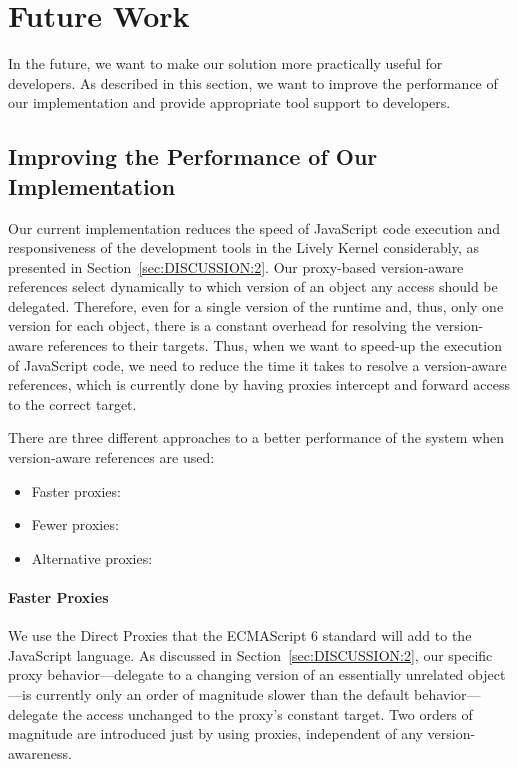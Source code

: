 \chapter{Future Work} \label{chapter:FUTURE_WORK}

In the future, we want to make our solution more practically useful for developers.
As described in this section, we want to improve the performance of our implementation and provide appropriate tool support to developers.



\section{Improving the Performance of Our Implementation} \label{sec:FUTURE_WORK:1}


Our current implementation reduces the speed of JavaScript code execution and responsiveness of the development tools in the Lively Kernel considerably, as presented in Section~\ref{sec:DISCUSSION:2}.
Our proxy-based version-aware references select dynamically to which version of an object any access should be delegated.
Therefore, even for a single version of the runtime and, thus, only one version for each object, there is a constant overhead for resolving the version-aware references to their targets.
Thus, when we want to speed-up the execution of JavaScript code, we need to reduce the time it takes to resolve a version-aware references, which is currently done by having proxies intercept and forward access to the correct target.

There are three different approaches to a better performance of the system when version-aware references are used:

\begin{itemize}
    \item Faster proxies:
    \item Fewer proxies:
    \item Alternative proxies:
\end{itemize}


\subsubsection{Faster Proxies}
We use the Direct Proxies that the ECMAScript 6 standard will add to the JavaScript language.
As discussed in Section~\ref{sec:DISCUSSION:2}, our specific proxy behavior---delegate to a changing version of an essentially unrelated object---is currently only an order of magnitude slower than the default behavior---delegate the access unchanged to the proxy's constant target.
Two orders of magnitude are introduced just by using proxies, independent of any version-awareness.

